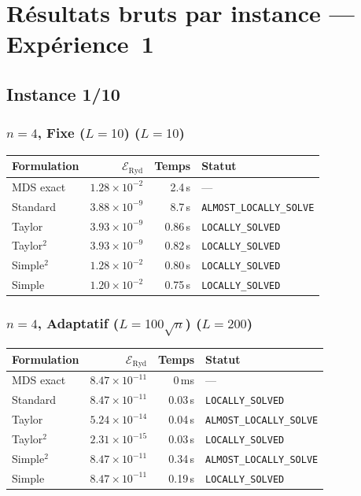 \section{Résultats bruts par instance --- Expérience~1}
\label{app:exp1-instances}
\subsection{Instance 1/10}
\subsubsection{$n=4$, Fixe ($L{=}10$) ($L=10$)}
\begin{longtable}{@{}lrrl@{}}
  \toprule
  Formulation & $\mathcal{E}_{\mathrm{Ryd}}$ & Temps & Statut \\
  \midrule
  \endhead
  MDS exact & $1.28\times10^{-2}$ & 2.4\,s & --- \\
  Standard & $3.88\times10^{-9}$ & 8.7\,s & \texttt{ALMOST\_LOCALLY\_SOLVE} \\
  Taylor & $3.93\times10^{-9}$ & 0.86\,s & \texttt{LOCALLY\_SOLVED} \\
  Taylor$^2$ & $3.93\times10^{-9}$ & 0.82\,s & \texttt{LOCALLY\_SOLVED} \\
  Simple$^2$ & $1.28\times10^{-2}$ & 0.80\,s & \texttt{LOCALLY\_SOLVED} \\
  Simple & $1.20\times10^{-2}$ & 0.75\,s & \texttt{LOCALLY\_SOLVED} \\
  \bottomrule
\end{longtable}

\subsubsection{$n=4$, Adaptatif ($L{=}100\sqrt{n}$) ($L=200$)}
\begin{longtable}{@{}lrrl@{}}
  \toprule
  Formulation & $\mathcal{E}_{\mathrm{Ryd}}$ & Temps & Statut \\
  \midrule
  \endhead
  MDS exact & $8.47\times10^{-11}$ & 0\,ms & --- \\
  Standard & $8.47\times10^{-11}$ & 0.03\,s & \texttt{LOCALLY\_SOLVED} \\
  Taylor & $5.24\times10^{-14}$ & 0.04\,s & \texttt{ALMOST\_LOCALLY\_SOLVE} \\
  Taylor$^2$ & $2.31\times10^{-15}$ & 0.03\,s & \texttt{LOCALLY\_SOLVED} \\
  Simple$^2$ & $8.47\times10^{-11}$ & 0.34\,s & \texttt{ALMOST\_LOCALLY\_SOLVE} \\
  Simple & $8.47\times10^{-11}$ & 0.19\,s & \texttt{LOCALLY\_SOLVED} \\
  \bottomrule
\end{longtable}

